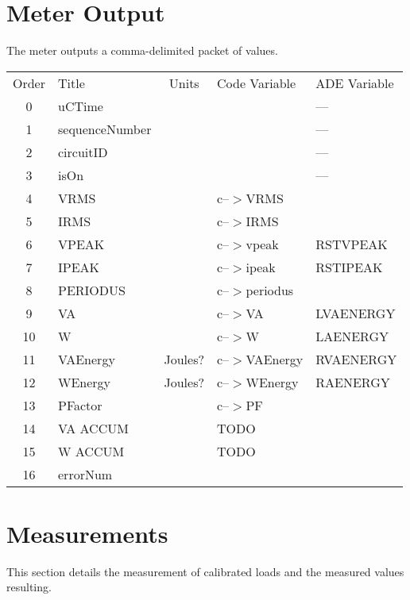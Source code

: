 \documentclass[]{article}
\begin{document}
\section{Meter Output}
The meter outputs a comma-delimited packet of values.

\begin{tabular}{ c l c l l }
Order & Title          & Units     & Code Variable  & ADE Variable \\
0     & uCTime         &           &                & ---          \\
1     & sequenceNumber &           &                & ---          \\
2     & circuitID      &           &                & ---          \\
3     & isOn           &           &                & ---          \\
4     & VRMS           &           & c--$>$VRMS     &              \\
5     & IRMS           &           & c--$>$IRMS     &              \\
6     & VPEAK          &           & c--$>$vpeak    & RSTVPEAK     \\
7     & IPEAK          &           & c--$>$ipeak    & RSTIPEAK     \\
8     & PERIODUS       &           & c--$>$periodus &              \\
9     & VA             &           & c--$>$VA       & LVAENERGY    \\
10    & W              &           & c--$>$W        & LAENERGY     \\
11    & VAEnergy       & Joules?   & c--$>$VAEnergy & RVAENERGY     \\
12    & WEnergy        & Joules?   & c--$>$WEnergy  & RAENERGY     \\
13    & PFactor        &           & c--$>$PF       &              \\
14    & VA ACCUM       &           & TODO        \\
15    & W ACCUM        &           & TODO        \\
16    & errorNum       &           &             \\
\end{tabular}

\section{Measurements}
This section details the measurement of calibrated loads and the
measured values resulting.
\end{document}
